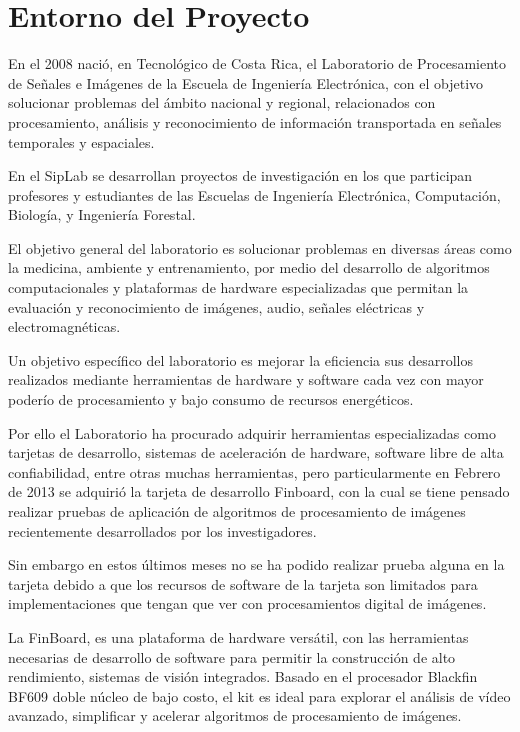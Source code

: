 
\section*{Entorno del Proyecto}
\label{chp:entorno}

En el 2008 naci\'{o}, en Tecnol\'{o}gico de Costa Rica, el Laboratorio de Procesamiento de Se\~{n}ales e Im\'{a}genes  de la Escuela de Ingenier\'{i}a Electr\'{o}nica, con el objetivo solucionar problemas del \'{a}mbito nacional y regional, relacionados con procesamiento, an\'{a}lisis y reconocimiento de informaci\'{o}n transportada en se\~{n}ales temporales y espaciales.

En el SipLab se desarrollan proyectos de investigaci\'{o}n en los que participan profesores y estudiantes de las Escuelas de Ingenier\'{i}a Electr\'{o}nica, Computaci\'{o}n, Biolog\'{i}a, y Ingenier\'{i}a Forestal.

El objetivo general del laboratorio es solucionar problemas en diversas \'{a}reas como la medicina, ambiente y entrenamiento, por medio del desarrollo de algoritmos computacionales y plataformas de hardware especializadas que permitan la evaluaci\'{o}n y reconocimiento de im\'{a}genes, audio, se\~{n}ales el\'{e}ctricas y electromagn\'{e}ticas.

Un objetivo espec\'{i}fico del laboratorio es mejorar  la eficiencia sus desarrollos realizados mediante herramientas de hardware y software cada vez con mayor poder\'{i}o de procesamiento y bajo consumo de recursos energ\'{e}ticos.

Por ello el Laboratorio ha procurado adquirir herramientas especializadas como tarjetas de desarrollo, sistemas de aceleraci\'{o}n de hardware, software libre de alta confiabilidad, entre otras muchas herramientas, pero particularmente en Febrero de 2013 se adquiri\'{o} la tarjeta de desarrollo Finboard, con la cual se tiene pensado realizar pruebas de aplicaci\'{o}n de algoritmos de procesamiento de im\'{a}genes recientemente desarrollados por los investigadores.

Sin embargo en estos \'{u}ltimos meses no se ha podido realizar prueba alguna en la tarjeta debido a que los recursos de software de la tarjeta son limitados para implementaciones que tengan que ver con procesamientos digital de im\'{a}genes.

La FinBoard, es  una plataforma de hardware vers\'{a}til, con las herramientas necesarias de desarrollo de software para permitir la construcci\'{o}n de alto rendimiento, sistemas de visi\'{o}n integrados. Basado en el procesador Blackfin BF609 doble n\'{u}cleo de bajo costo, el kit es ideal para explorar el an\'{a}lisis de v\'{i}deo avanzado, simplificar y acelerar algoritmos de procesamiento de im\'{a}genes.

